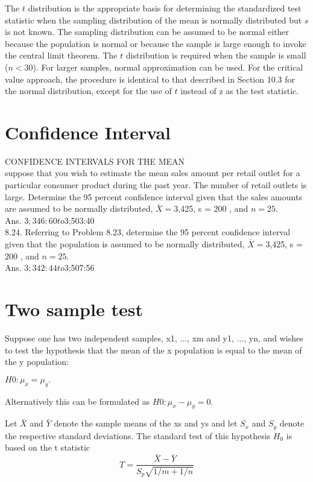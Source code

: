 The $t$ distribution is the appropriate basis for
determining the standardized test statistic when the sampling
distribution of the mean is normally distributed but $s$ is not
known. The sampling distribution can be assumed to be normal
either because the population is normal or because the sample is
large enough to invoke the central limit theorem. The $t$
distribution is required when the sample is small ($n < 30$). For
larger samples, normal approximation can be used. For the critical
value approach, the procedure is identical to that described in
Section 10.3 for the normal distribution, except for the use of $t$
instead of z as the test statistic.

\section{Confidence Interval} CONFIDENCE INTERVALS FOR THE MEAN\\
suppose that you wish to estimate the mean sales amount per
retail outlet for a particular consumer product during the past
year. The number of retail outlets is large. Determine the
95 percent confidence interval given that the sales amounts are
assumed to be normally distributed, $\bar{X} = $3,425, s = $200$ ,
and $n = 25.$\\ Ans. $3;346:60 to $3;503:40
\\
8.24. Referring to Problem 8.23, determine the 95 percent
confidence interval given that the population is assumed to be
normally distributed, $\bar{X} = $3,425, s = $200$ , and $n = 25.$
\\Ans. $3;342:44 to $3;507:56
\section{Two sample test}
Suppose one has two independent samples, x1, ..., xm and y1, ...,
yn, and wishes to test the hypothesis that the mean of the x
population is equal to the mean of the y population:

$H0 : \mu_{x} = \mu_{y}.$

Alternatively this can be formulated as $H0 : \mu_{x} - \mu_{y} =
0$.

Let $\bar{X}$ and $\bar{Y}$ denote the sample means of the xs and
ys and let $S_{x}$ and $S_{y}$ denote the respective standard
deviations. The standard test of this hypothesis $H_{0}$ is based
on the t statistic
\begin{equation}T = \frac{\bar{X} - \bar{Y} }{S_{p} \sqrt{1/m + 1/n} }
\end{equation}

